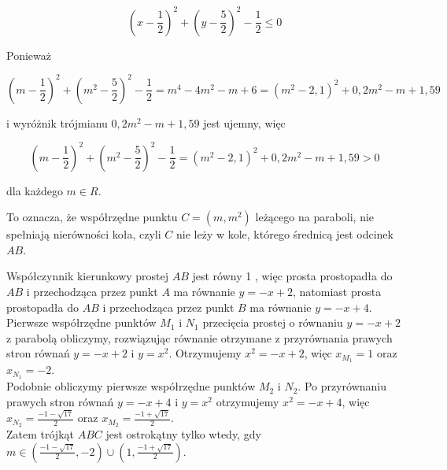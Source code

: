 \documentclass[10pt]{article}
\begin{document}
$$
\left(x-\frac{1}{2}\right)^{2}+\left(y-\frac{5}{2}\right)^{2}-\frac{1}{2} \leq 0
$$

Ponieważ

$$
\left(m-\frac{1}{2}\right)^{2}+\left(m^{2}-\frac{5}{2}\right)^{2}-\frac{1}{2}=m^{4}-4 m^{2}-m+6=\left(m^{2}-2,1\right)^{2}+0,2 m^{2}-m+1,59
$$

i wyróżnik trójmianu $0,2 m^{2}-m+1,59$ jest ujemny, więc

$$
\left(m-\frac{1}{2}\right)^{2}+\left(m^{2}-\frac{5}{2}\right)^{2}-\frac{1}{2}=\left(m^{2}-2,1\right)^{2}+0,2 m^{2}-m+1,59>0
$$

dla każdego $m \in R$.

To oznacza, że współrzędne punktu $C=\left(m, m^{2}\right)$ leżącego na paraboli, nie spełniają nierówności koła, czyli $C$ nie leży w kole, którego średnicą jest odcinek $A B$.

Współczynnik kierunkowy prostej $A B$ jest równy 1 , więc prosta prostopadła do $A B$ i przechodząca przez punkt $A$ ma równanie $y=-x+2$, natomiast prosta prostopadła do $A B$ i przechodząca przez punkt $B$ ma równanie $y=-x+4$.\\
Pierwsze współrzędne punktów $M_{1}$ i $N_{1}$ przecięcia prostej o równaniu $y=-x+2$ z parabolą obliczymy, rozwiązując równanie otrzymane z przyrównania prawych stron równań $y=-x+2$ i $y=x^{2}$. Otrzymujemy $x^{2}=-x+2$, więc $x_{M_{1}}=1$ oraz $x_{N_{1}}=-2$.\\
Podobnie obliczymy pierwsze współrzędne punktów $M_{2}$ i $N_{2}$. Po przyrównaniu prawych stron równań $y=-x+4$ i $y=x^{2}$ otrzymujemy $x^{2}=-x+4$, więc $x_{N_{2}}=\frac{-1-\sqrt{17}}{2}$ oraz $x_{M_{2}}=\frac{-1+\sqrt{17}}{2}$.\\
Zatem trójkąt $A B C$ jest ostrokątny tylko wtedy, gdy $m \in\left(\frac{-1-\sqrt{17}}{2},-2\right) \cup\left(1, \frac{-1+\sqrt{17}}{2}\right)$.
\end{document}
